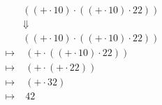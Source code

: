 \documentclass{article}
\begin{document}
\tiny\begin{align*}
&\left(\left(+\cdot 10\right)\cdot \left(\left(+\cdot 10\right)\cdot 22\right)\right)\\ 
&\Downarrow\\ 
&\left(\left(\mathtt{+}\cdot 10\right)\cdot \left(\left(\mathtt{+}\cdot 10\right)\cdot 22\right)\right)\\ 
\longmapsto &\;\left(\mathtt{+}\cdot \left(\left(\mathtt{+}\cdot 10\right)\cdot 22\right)\right)\\ 
\longmapsto &\;\left(\mathtt{+}\cdot \left(\mathtt{+}\cdot 22\right)\right)\\ 
\longmapsto &\;\left(\mathtt{+}\cdot 32\right)\\ 
\longmapsto &\;42\\ 
\end{align*}
\end{document}
